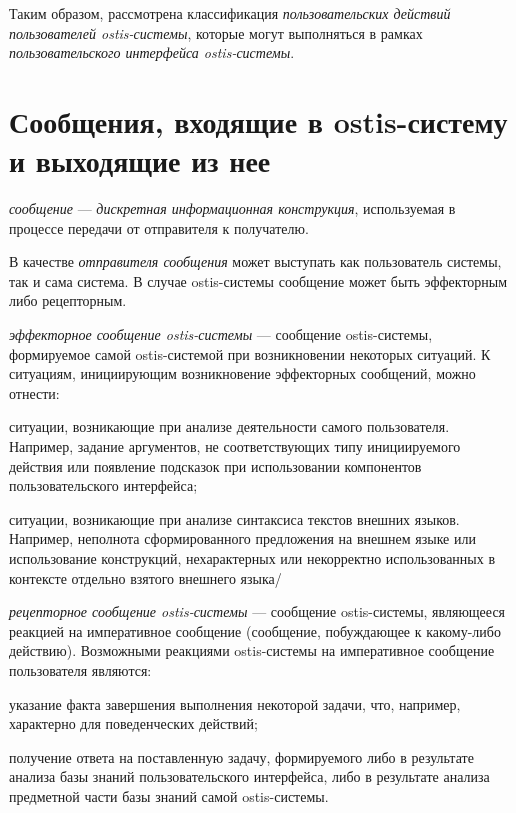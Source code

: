 Таким образом, рассмотрена классификация \textit{пользовательских действий пользователей ostis-системы}, которые могут выполняться в рамках \textit{пользовательского интерфейса ostis-системы}.

\section{Сообщения, входящие в ostis-систему и выходящие из нее}
\label{sec_messages}

\textit{сообщение} --- \textit{дискретная информационная конструкция}, используемая в процессе передачи от отправителя к получателю.

В качестве \textit{отправителя сообщения} может выступать как пользователь системы, так и сама система. В случае ostis-системы сообщение может быть эффекторным либо рецепторным.

\textit{эффекторное сообщение ostis-системы} --- сообщение ostis-системы, формируемое самой ostis-системой при возникновении некоторых ситуаций. К ситуациям, инициирующим возникновение эффекторных сообщений, можно отнести:
\begin{textitemize}
	\item ситуации, возникающие при анализе деятельности самого пользователя. Например, задание аргументов, не соответствующих типу инициируемого действия или появление подсказок при использовании компонентов пользовательского интерфейса;
	\item ситуации, возникающие при анализе синтаксиса текстов внешних языков. Например, неполнота сформированного предложения на внешнем языке или использование конструкций, нехарактерных или некорректно использованных в контексте отдельно взятого внешнего языка/
\end{textitemize}

\textit{рецепторное сообщение ostis-системы} --- сообщение ostis-системы, являющееся реакцией на императивное сообщение (сообщение, побуждающее к какому-либо действию). Возможными реакциями ostis-системы на императивное сообщение пользователя являются:
\begin{textitemize}
	\item указание факта завершения выполнения некоторой задачи, что, например, характерно для поведенческих действий;
	\item получение ответа на поставленную задачу, формируемого либо в результате анализа базы знаний пользовательского интерфейса, либо в результате анализа предметной части базы знаний самой ostis-системы.
\end{textitemize}

